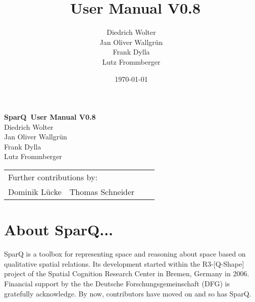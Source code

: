 \documentclass[headsepline]{scrreprt}
\title{\engine\ User Manual V0.8}
\author{Diedrich Wolter\\ Jan Oliver Wallgr{\"u}n \\ Frank Dylla\\ Lutz Frommberger}
\date{\today}
\theoremstyle{definition}
\newcommand{\qshape}{R3-[Q-Shape]}
\newcommand{\engine}{SparQ}
\begin{document}

\begin{titlepage}
\begin{center}
{\huge \bfseries{\engine\ User Manual V0.8\\}}
\bigskip
{\LARGE 
Diedrich Wolter\\ Jan Oliver Wallgr{\"u}n \\ Frank Dylla\\ Lutz Frommberger\\
}
\end{center}
\vfill
\begin{tabular}{llll}
\multicolumn{2}{l}{Further contributions by:}\\[1ex]
Dominik L\"ucke & Thomas Schneider &  & \\
\end{tabular}
\vfill
\end{titlepage}
\tableofcontents


\chapter*{About SparQ...}


\engine{} is a toolbox for representing space and reasoning about
space based on  qualitative spatial relations. Its development started
within the \qshape{} project of the Spatial Cognition Research Center in Bremen, Germany in 2006.
Financial support by the the Deutsche Forschungsgemeinschaft (DFG)  is gratefully acknowledge.
By now, contributors have moved on and so has \engine{}.
\end{document}
